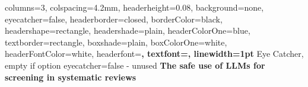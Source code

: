 \documentclass[a0paper,portrait]{baposter}
\begin{document}

\background{
}

\begin{poster}{
	columns=3,
	colspacing=4.2mm,
	headerheight=0.08\textheight,
	background=none,
	eyecatcher=false,
	headerborder=closed,
	borderColor=black,
	headershape=rectangle,
	headershade=plain,
	headerColorOne=blue,
	textborder=rectangle,
	boxshade=plain,
	boxColorOne=white,
	headerFontColor=white,
	headerfont=\color{white}\large\bfseries\sffamily,
	textfont=\larger\sffamily,
	linewidth=1pt
}
{
	Eye Catcher, empty if option eyecatcher=false - unused
}
{\sf\bf
	\vspace{1em}The safe use of LLMs for screening in systematic reviews
}
{

}
{
\setlength\fboxsep{0pt}
\setlength\fboxrule{0pt}
}



\end{poster}
\end{document}
